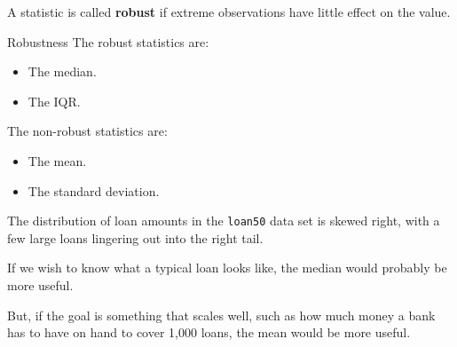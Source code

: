 \documentclass[handout]{beamer}
\begin{document}
\begin{frame}
\begin{definition}
A statistic is called \textbf{robust} if extreme observations have little effect on the value.
\end{definition}\pause

\begin{block}{Robustness}
The robust statistics are:
\begin{itemize}
\item The median.
\item The IQR.\@
\end{itemize}\pause

The non-robust statistics are:
\begin{itemize}
\item The mean.
\item The standard deviation.
\end{itemize}
\end{block}
\end{frame}

\begin{frame}
\begin{example}
The distribution of loan amounts in the \texttt{loan50} data set is skewed right, with a few large loans lingering out into the right tail.
\begin{center}
\end{center}
\pause
{}\pause

\vspace{1.5mm}
If we wish to know what a typical loan looks like, the median would probably be more useful. \pause

\vspace{1.5mm}
But, if the goal is something that scales well, such as how much money a bank has to have on hand to cover 1,000 loans, the mean would be more useful.
\end{example}
\end{frame}
\end{document}
